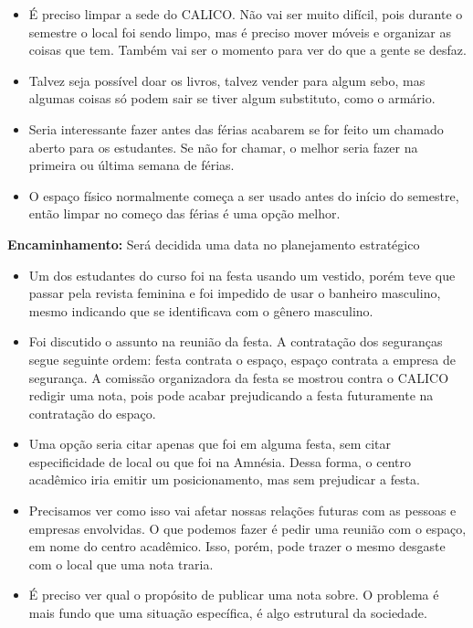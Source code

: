 \documentclass{ata-calico}
\begin{document}
\begin{itemize}
\item É preciso limpar a sede do CALICO. Não vai ser muito difícil, pois durante o semestre o local foi sendo limpo, mas é preciso mover móveis e organizar as coisas que tem. Também vai ser o momento para ver do que a gente se desfaz.
\item Talvez seja possível doar os livros, talvez vender para algum sebo, mas algumas coisas só podem sair se tiver algum substituto, como o armário.
\item Seria interessante fazer antes das férias acabarem se for feito um chamado aberto para os estudantes. Se não for chamar, o melhor seria fazer na primeira ou última semana de férias.
\item O espaço físico normalmente começa a ser usado antes do início do semestre, então limpar no começo das férias é uma opção melhor.
\end{itemize}

\textbf{Encaminhamento:} Será decidida uma data no planejamento estratégico

\begin{itemize}
\item Um dos estudantes do curso foi na festa usando um vestido, porém teve que passar pela revista feminina e foi impedido de usar o banheiro masculino, mesmo indicando que se identificava com o gênero masculino.
\item Foi discutido o assunto na reunião da festa. A contratação dos seguranças segue seguinte ordem: festa contrata o espaço, espaço contrata a empresa de segurança. A comissão organizadora da festa se mostrou contra o CALICO redigir uma nota, pois pode acabar prejudicando a festa futuramente na contratação do espaço.
\item Uma opção seria citar apenas que foi em alguma festa, sem citar especificidade de local ou que foi na Amnésia. Dessa forma, o centro acadêmico iria emitir um posicionamento, mas sem prejudicar a festa.
\item Precisamos ver como isso vai afetar nossas relações futuras com as pessoas e empresas envolvidas. O que podemos fazer é pedir uma reunião com o espaço, em nome do centro acadêmico. Isso, porém, pode trazer o mesmo desgaste com o local que uma nota traria.
\item É preciso ver qual o propósito de publicar uma nota sobre. O problema é mais fundo que uma situação específica, é algo estrutural da sociedade.
\end{itemize}
\end{document}
